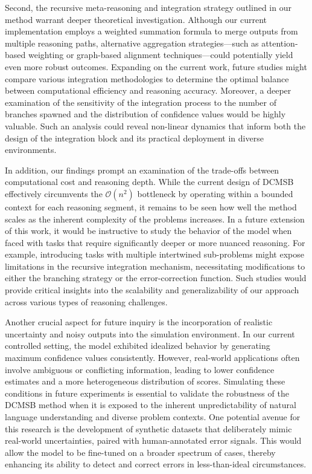 \documentclass{article}
\begin{document}
Second, the recursive meta-reasoning and integration strategy outlined in our method warrant deeper theoretical investigation. Although our current implementation employs a weighted summation formula to merge outputs from multiple reasoning paths, alternative aggregation strategies—such as attention-based weighting or graph-based alignment techniques—could potentially yield even more robust outcomes. Expanding on the current work, future studies might compare various integration methodologies to determine the optimal balance between computational efficiency and reasoning accuracy. Moreover, a deeper examination of the sensitivity of the integration process to the number of branches spawned and the distribution of confidence values would be highly valuable. Such an analysis could reveal non-linear dynamics that inform both the design of the integration block and its practical deployment in diverse environments.

In addition, our findings prompt an examination of the trade-offs between computational cost and reasoning depth. While the current design of DCMSB effectively circumvents the $\mathcal{O}(n^2)$ bottleneck by operating within a bounded context for each reasoning segment, it remains to be seen how well the method scales as the inherent complexity of the problems increases. In a future extension of this work, it would be instructive to study the behavior of the model when faced with tasks that require significantly deeper or more nuanced reasoning. For example, introducing tasks with multiple intertwined sub-problems might expose limitations in the recursive integration mechanism, necessitating modifications to either the branching strategy or the error-correction function. Such studies would provide critical insights into the scalability and generalizability of our approach across various types of reasoning challenges.

Another crucial aspect for future inquiry is the incorporation of realistic uncertainty and noisy outputs into the simulation environment. In our current controlled setting, the model exhibited idealized behavior by generating maximum confidence values consistently. However, real-world applications often involve ambiguous or conflicting information, leading to lower confidence estimates and a more heterogeneous distribution of scores. Simulating these conditions in future experiments is essential to validate the robustness of the DCMSB method when it is exposed to the inherent unpredictability of natural language understanding and diverse problem contexts. One potential avenue for this research is the development of synthetic datasets that deliberately mimic real-world uncertainties, paired with human-annotated error signals. This would allow the model to be fine-tuned on a broader spectrum of cases, thereby enhancing its ability to detect and correct errors in less-than-ideal circumstances.
\end{document}
